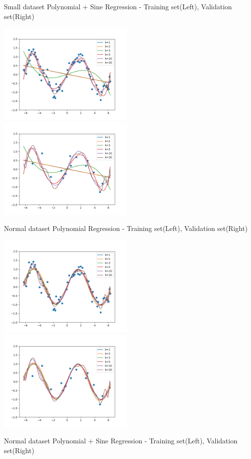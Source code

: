 \begin{answer}
Small dataset Polynomial + Sine Regression - Training set(Left), Validation set(Right)

\includegraphics[width=0.5\textwidth]{featuremaps/plot_train_poly.png}
\includegraphics[width=0.5\textwidth]{featuremaps/plot_valid_poly.png}

Normal dataset Polynomial Regression - Training set(Left), Validation set(Right)

\includegraphics[width=0.5\textwidth]{featuremaps/plot_train_sine.png}
\includegraphics[width=0.5\textwidth]{featuremaps/plot_valid_sine.png}

Normal dataset Polynomial + Sine Regression - Training set(Left), Validation set(Right)

\end{answer}
